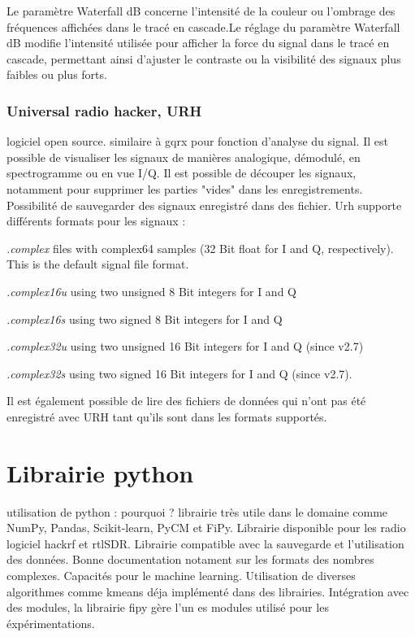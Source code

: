 Le paramètre Waterfall dB concerne l'intensité de la couleur ou l'ombrage des fréquences affichées dans le tracé en cascade.Le réglage du paramètre Waterfall dB modifie l'intensité utilisée pour afficher la force du signal dans le tracé en cascade, permettant ainsi d'ajuster le contraste ou la visibilité des signaux plus faibles ou plus forts.


\subsubsection{Universal radio hacker, URH}

logiciel open source. similaire à gqrx pour fonction d'analyse du signal. Il est possible de visualiser les signaux de manières analogique, démodulé, en spectrogramme ou en vue I/Q. Il est possible de découper les signaux, notamment pour supprimer les parties "vides" dans les enregistrements. Possibilité de sauvegarder des signaux enregistré dans des fichier. Urh supporte différents formats pour les signaux :

 \textit{.complex} files with complex64 samples (32 Bit float for I and Q, respectively). This is the default signal file format.
 
\textit{.complex16u} using two unsigned 8 Bit integers for I and Q

\textit{.complex16s} using two signed 8 Bit integers for I and Q

\textit{.complex32u} using two unsigned 16 Bit integers for I and Q (since v2.7)

\textit{.complex32s} using two signed 16 Bit integers for I and Q (since v2.7).

Il est également possible de lire des fichiers de données qui n'ont pas été enregistré avec URH tant qu'ils sont dans les formats supportés.

\section{Librairie python}

utilisation de python : pourquoi ?
librairie très utile dans le domaine comme NumPy, Pandas, Scikit-learn, PyCM et FiPy.
Librairie disponible pour les radio logiciel hackrf et rtlSDR.
Librairie compatible avec la sauvegarde et l'utilisation des données. Bonne documentation notament sur les formats des nombres complexes.
Capacités pour le machine learning. Utilisation de diverses algorithmes comme kmeans déja implémenté dans des librairies.
Intégration avec des modules, la librairie fipy gère l'un es modules utilisé pour les éxpérimentations.

